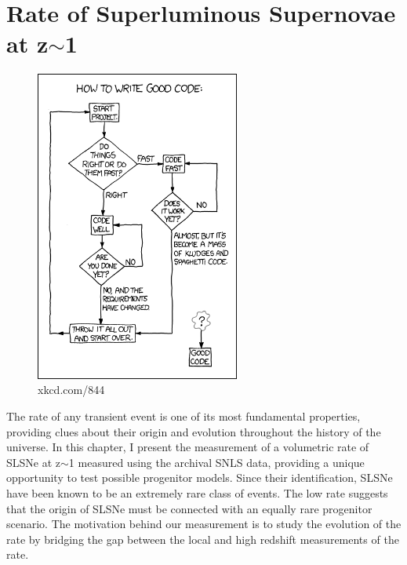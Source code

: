 \chapter{Rate of Superluminous Supernovae at z$\sim$1}
\label{Chapter4}

\begin{figure}[H]
  \centering
  \includegraphics[width=0.6\textwidth]{Figures/xkcd/chapter4.png}
  \caption*{xkcd.com/844}
\end{figure}

The rate of any transient event is one of its most fundamental properties, providing clues about their origin and evolution throughout the history of the universe. In this chapter, I present the measurement of a volumetric rate of SLSNe at z$\sim$1 measured using the archival SNLS data, providing a unique opportunity to test possible progenitor models. Since their identification, SLSNe have been known to be an extremely rare class of events. The low rate suggests that the origin of SLSNe must be connected with an equally rare progenitor scenario. The motivation behind our measurement is to study the evolution of the rate by bridging the gap between the local and high redshift measurements of the rate.

